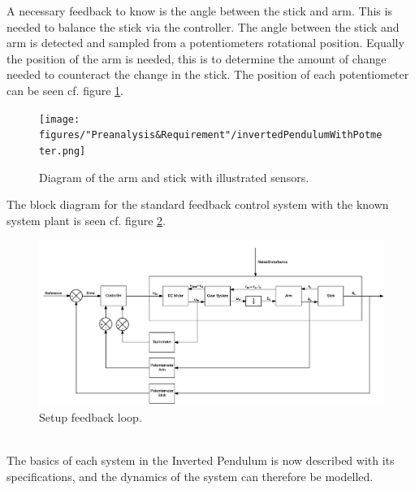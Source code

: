 A necessary feedback to know is the angle between the stick and arm. This is needed to balance the stick via the controller. The angle between the stick and arm is detected and sampled from a potentiometers rotational position. Equally the position of the arm is needed, this is to determine the amount of change needed to counteract the change in the stick. The position of each potentiometer can be seen cf. figure \ref{fig:InvertedPendulumSetUpPotmeter}. 

\begin{figure} [htbp]
	\centering
	\texttt{[image: figures/"Preanalysis\&Requirement"/invertedPendulumWithPotmeter.png]}
	\caption{Diagram of the arm and stick with illustrated sensors.} \label{fig:InvertedPendulumSetUpPotmeter}
\end{figure}
\newpage
The block diagram for the standard feedback control system with the known system plant is seen cf. figure \ref{fig:FeedbackSystem}. 

\begin{figure}[htbp]
\hspace*{-2.5 cm} 
	\centering
	\includegraphics[width=0.95\paperwidth]{figures/modeling/MechanicalSystem}
	\caption{Setup feedback loop.} \label{fig:FeedbackSystem}
\end{figure}
\\

The basics of each system in the Inverted Pendulum is now described with its specifications, and the dynamics of the system can therefore be modelled.


\newpage
